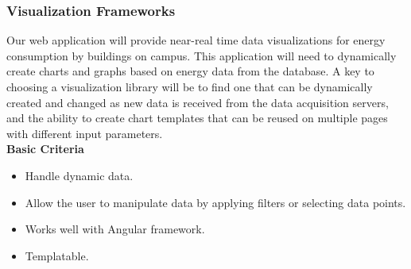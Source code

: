 \subsubsection{Visualization Frameworks}
Our web application will provide near-real time data visualizations for energy consumption by buildings on campus. This application will need to dynamically create charts and graphs based on energy data from the database. A key to choosing a visualization library will be to find one that can be dynamically created and changed as new data is received from the data acquisition servers, and the ability to create chart templates that can be reused on multiple pages with different input parameters.\\
\textbf{Basic Criteria}
\begin{itemize}
\item Handle dynamic data. 
\item Allow the user to manipulate data by applying filters or selecting data points. 
\item Works well with Angular framework.
\item Templatable.
\end{itemize}
